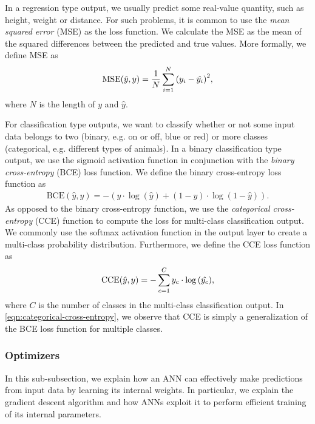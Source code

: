 In a regression type output, we usually predict some real-value quantity, such as height, weight or distance. For such problems, it is common to use the \textit{mean squared error} (MSE) as the loss function. We calculate the MSE as the mean of the squared differences between the predicted and true values. More formally, we define MSE as
\begin{align}
    \label{eqn:mean-squared-error}
    \text{MSE}(\hat{y}, y) = \frac{1}{N} \sum\limits_{i=1}^{N} {\left( y_i - \hat{y_i} \right)}^2,
\end{align}
where $N$ is the length of $y$ and $\hat{y}$.

For classification type outputs, we want to classify whether or not some input data belongs to two (binary, e.g. on or off, blue or red) or more classes (categorical, e.g. different types of animals). In a binary classification type output, we use the sigmoid activation function in conjunction with the \textit{binary cross-entropy} (BCE) loss function. We define the binary cross-entropy loss function as
\begin{align}
    \label{eqn:binary-cross-entropy}
    \text{BCE}(\hat{y}, y) = -\left( y \cdot \log{\left( \hat{y} \right)} + (1 - y) \cdot \log{\left( 1 - \hat{y} \right)} \right).
\end{align}
As opposed to the binary cross-entropy function, we use the \textit{categorical cross-entropy} (CCE) function to compute the loss for multi-class classification output. We commonly use the softmax activation function in the output layer to create a multi-class probability distribution. Furthermore, we define the CCE loss function as
\begin{align}
    \label{eqn:categorical-cross-entropy}
    \text{CCE}(\hat{y}, y) = -\sum\limits_{c=1}^{C} y_c \cdot \log{\left( \hat{y_c} \right)},
\end{align}
where $C$ is the number of classes in the multi-class classification output. In \cref{eqn:categorical-cross-entropy}, we observe that CCE is simply a generalization of the BCE loss function for multiple classes.

\subsubsection{Optimizers}
\label{sec:ann-optimizers}
In this sub-subsection, we explain how an ANN can effectively make predictions from input data by learning its internal weights. In particular, we explain the gradient descent algorithm and how ANNs exploit it to perform efficient training of its internal parameters.

